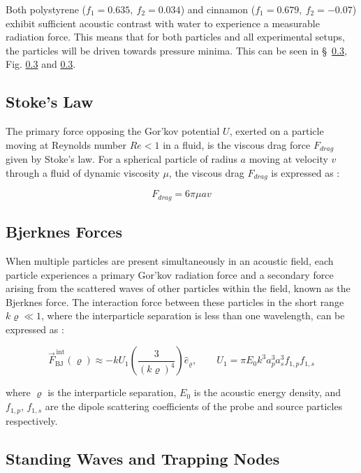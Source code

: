\documentclass[11pt,a4paper]{article}
\begin{document}
\noindent Both polystyrene ($f_1 = 0.635,\ f_2 = 0.034$) and cinnamon ($f_1 = 0.679,\ f_2 = -0.07$) exhibit sufficient acoustic contrast with water to experience a measurable radiation force. This means that for both particles and all experimental setups, the particles will be driven towards pressure minima. This can be seen in \S~\ref{}, Fig. \ref{} and \ref{}. 

\subsection{Stoke's Law}
\label{subsec:stokes}

The primary force opposing the Gor'kov potential $U$, exerted on a particle moving at Reynolds number $Re<1$ in a fluid, is the viscous drag force $F_{drag}$ given by Stoke's law. For a spherical particle of radius $a$ moving at velocity $v$ through a fluid of dynamic viscosity $\mu$, the viscous drag $F_{drag}$ is expressed as \cite{stokesLawUVA}:

\begin{equation}
    F_{drag} = 6\pi \mu a v
\label{eq:stokes}
\end{equation}

\subsection{Bjerknes Forces}
\label{subsec:bjerknes}

When multiple particles are present simultaneously in an acoustic field, each particle experiences a primary Gor'kov radiation force and a secondary force arising from the scattered waves of other particles within the field, known as the Bjerknes force. The interaction force between these particles in the short range $k\varrho \ll 1$, where the interparticle separation is less than one wavelength, can be expressed as \cite{silva2014}:

\begin{equation}
    \vec{F}^{\,\text{int}}_{\text{BJ}}(\varrho) \approx 
    -kU_1\left(\frac{3}{(k\varrho)^4}\right)\hat{e}_\varrho, 
    \qquad 
    U_1 = \pi E_0 k^3 a_p^3 a_s^3 f_{1,p} f_{1,s}
    \label{eq:bjerknes}
\end{equation}

\noindent where $\varrho$ is the interparticle separation, $E_0$ is the acoustic energy density, and $f_{1,p}$, $f_{1,s}$ are the dipole scattering coefficients of the probe and source particles respectively. 

\subsection{Standing Waves and Trapping Nodes}
\end{document}

